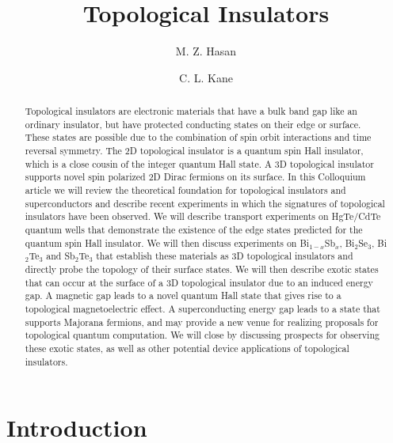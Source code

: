 \documentclass[twocolumn,floatfix,showpacs,rmp,aps]{revtex4}
\begin{document}
\title{Topological Insulators}

\author{M. Z. Hasan}

\author{C. L. Kane}

\begin{abstract}
Topological insulators are electronic materials that
have a bulk band gap like an ordinary insulator, but have protected conducting
states on their edge or surface.  These states are possible due to the combination of spin orbit
interactions and time reversal symmetry.  The 2D topological insulator is a
quantum spin Hall insulator, which is a close cousin of the integer
quantum Hall state. A 3D topological
insulator supports novel spin polarized 2D Dirac fermions on its surface.  In this
Colloquium article we will review the theoretical foundation for
topological insulators and superconductors and describe recent experiments in which
the signatures of topological insulators have been observed.  We will describe transport
experiments on HgTe/CdTe quantum wells that demonstrate the
existence of the edge states predicted for the quantum spin Hall
insulator. We will then discuss experiments on Bi$_{1-x}$Sb$_x$, Bi$_2$Se$_3$,
Bi$_2$Te$_3$ and Sb$_2$Te$_3$ that establish these materials as 3D topological
insulators and directly probe the topology of their surface states.
We will then describe exotic
states that can occur at the surface of a 3D topological
insulator due to an induced energy gap.  A magnetic gap leads to a
novel quantum Hall state that gives rise to a topological
magnetoelectric effect.  A superconducting energy gap leads to a
state that supports Majorana fermions, and may provide a new venue
for realizing proposals for topological quantum computation.  We will
close by discussing prospects for observing these exotic states, as
well as other potential device applications of topological
insulators.
\end{abstract}

\maketitle
\tableofcontents

\section{Introduction}
\label{sec:intro}
\end{document}
